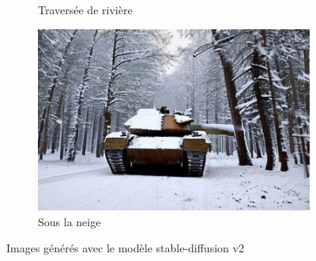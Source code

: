 \begin{figure}[H]
\begin{subfigure}[b]{0.49\textwidth}
        \caption{Traversée de rivière}
    \end{subfigure}
    \begin{subfigure}[b]{0.49\textwidth}
        \centering
        \includegraphics[width=\textwidth]{./images/v2_tank-snow-1.png}
        \caption{Sous la neige}
    \end{subfigure}
    \caption{Images générés avec le modèle stable-diffusion v2}
    \label{fig:image_sdv2}
\end{figure}


